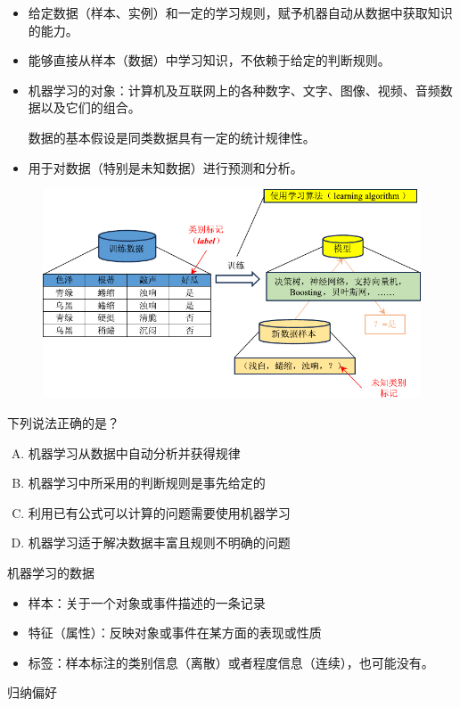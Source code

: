 \begin{itemize}
    \item 给定数据（样本、实例）和一定的学习规则，赋予机器自动从数据中获取知识的能力。
    \item 能够直接从样本（数据）中学习知识，不依赖于给定的判断规则。
    \item 机器学习的对象：计算机及互联网上的各种数字、文字、图像、视频、音频数据以及它们的组合。
    
    数据的基本假设是同类数据具有一定的统计规律性。
    \item 用于对数据（特别是未知数据）进行预测和分析。
\end{itemize}
\begin{figure}[htbp]
    \centering
    \includegraphics{image/机器学习思路.pdf}
\end{figure}
\begin{example}
    下列说法正确的是？
    \begin{enumerate}[A.]
        \item \textcolor{main1}{机器学习从数据中自动分析并获得规律}
        \item 机器学习中所采用的判断规则是事先给定的
        \item 利用已有公式可以计算的问题需要使用机器学习
        \item \textcolor{main1}{机器学习适于解决数据丰富且规则不明确的问题}
    \end{enumerate}
\end{example}
\textcolor{main1}{机器学习的数据}
\begin{itemize}
    \item \textcolor{main1}{样本：}关于一个对象或事件描述的一条记录
    \item \textcolor{main1}{特征（属性）：}反映对象或事件在某方面的表现或性质
    \item \textcolor{main1}{标签：}样本标注的类别信息（离散）或者程度信息（连续），也可能没有。
\end{itemize}
\textcolor{main1}{归纳偏好}


